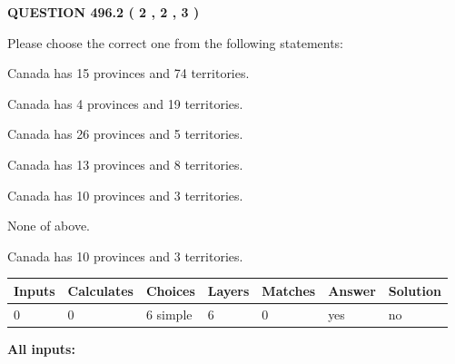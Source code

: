 \documentclass[12pt]{article}
\begin{document}
   
  
\vspace{0.2in}
  
{\textbf{\Large{QUESTION
496.2 
 ( 2 , 2 , 3 )
}}}
  
  
Please choose the correct one from the following statements:
 
 
Canada has  15 provinces and  74 territories.
 
 
Canada has   4 provinces and  19 territories.
 
 
Canada has  26 provinces and  5 territories.
 
 
Canada has  13 provinces and  8 territories.
 
 
Canada has 10  provinces and 3 territories.
 
 
 None of above.
 
 
\noindent{}
 
 
Canada has 10  provinces and 3 territories.
 
 
\noindent{}
 
 
   
   
   
   
\noindent\begin{tabular}{|l|l|l|l|l|l|l|}
 \hline
Inputs & Calculates & Choices & Layers & Matches & Answer & Solution \\ \hline
 0  & 
 0  & 
 6
  simple  
  & 
 6  & 
 0  & 
  yes & 
  no 
  \\ \hline
 \end{tabular}
   
   
   
   
\noindent{}
   
   
   
   
\noindent\vspace{0.1in}\hspace{-0.08in} {\textbf{\Large{All inputs: }}}
   
   
   
   
   
   
 \vspace{0.2in}
 
\end{document}
